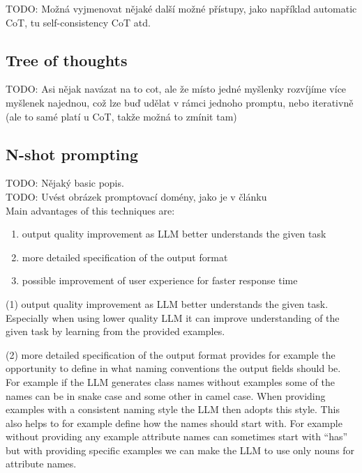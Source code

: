 TODO: Možná vyjmenovat nějaké další možné přístupy, jako například automatic CoT, tu self-consistency CoT atd. \\


\subsection{Tree of thoughts}

TODO: Asi nějak navázat na to cot, ale že místo jedné myšlenky rozvíjíme více myšlenek najednou, což lze buď udělat v rámci jednoho promptu, nebo iterativně (ale to samé platí u CoT, takže možná to zmínit tam)


\subsection{N-shot prompting}

TODO: Nějaký basic popis. \\

TODO: Uvést obrázek promptovací domény, jako je v článku \\

Main advantages of this techniques are:

\begin{enumerate}
\item output quality improvement as LLM better understands the given task
\item more detailed specification of the output format
\item possible improvement of user experience for faster response time
\end{enumerate}

(1) output quality improvement as LLM better understands the given task. Especially when using lower quality LLM it can improve understanding of the given task by learning from the provided examples.

(2) more detailed specification of the output format provides for example the opportunity to define in what naming conventions the output fields should be. For example if the LLM generates class names without examples some of the names can be in snake case and some other in camel case. When providing examples with a consistent naming style the LLM then adopts this style. This also helps to for example define how the names should start with. For example without providing any example attribute names can sometimes start with ``has'' but with providing specific examples we can make the LLM to use only nouns for attribute names. \\

